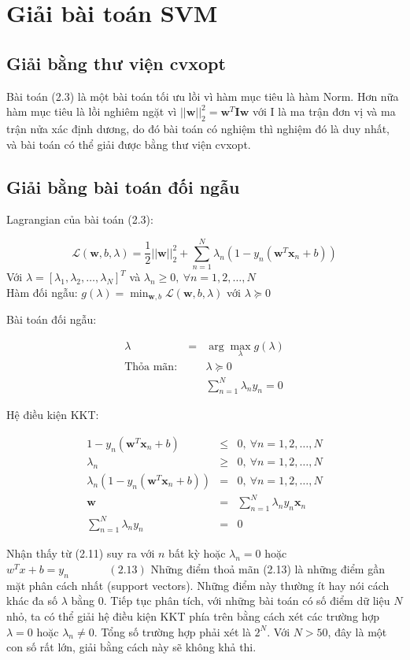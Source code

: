 \documentclass[a4paper, 12pt, oneside]{report}
\begin{document}
\section{Giải bài toán SVM }
\subsection{Giải bằng thư viện cvxopt} 
Bài toán (2.3) là một bài toán tối ưu lồi vì hàm mục tiêu là hàm Norm. Hơn nữa hàm mục tiêu là lồi nghiêm ngặt vì  $||\mathbf{w}||_2^2 =  \mathbf{w}^T\mathbf{I}\mathbf{w}$ với I là ma trận đơn vị và ma trận nửa xác định dương, do đó bài toán có nghiệm thì nghiệm đó là duy nhất, và bài toán có thể giải được bằng thư viện cvxopt.
\subsection{Giải bằng bài toán đối ngẫu}
Lagrangian của bài toán (2.3):
\begin{mybox}
\begin{center}
$$\mathcal{L}(\mathbf{w}, b, \lambda) = \frac{1}{2} ||\mathbf{w}||_2^2 + \sum_{n=1}^N \lambda_n(1 - y_n(\mathbf{w}^T\mathbf{x}_n + b) )$$
Với $\lambda = [\lambda_1, \lambda_2, \dots, \lambda_N]^T$ và $\lambda_n \geq 0, ~\forall n = 1, 2, \dots, N$ \\
Hàm đối ngẫu: $g(\lambda) = \min_{\mathbf{w}, b} \mathcal{L}(\mathbf{w}, b, \lambda)$ với $\lambda \succeq 0$ \\
\end{center}
\end{mybox}
Bài toán đối ngẫu: 
\begin{mybox}
\begin{eqnarray}
     \lambda &=& \arg \max_{\lambda} g(\lambda)   \\
     \text{Thỏa mãn:}~ && \lambda \succeq 0\\
     && \sum_{n=1}^N \lambda_ny_n = 0 
 \end{eqnarray} \end{mybox}
Hệ điều kiện KKT: 
 \begin{mybox}
 \begin{eqnarray}
1 - y_n(\mathbf{w}^T\mathbf{x}_n + b) &\leq& 0, ~ \forall n = 1, 2, \dots, N \\
\lambda_n &\geq& 0, ~\forall n = 1, 2, \dots, N  \\
\lambda_n (1 - y_n(\mathbf{w}^T\mathbf{x}_n + b)) &=& 0, ~\forall n = 1, 2, \dots, N  \\
 \mathbf{w} &=& \sum_{n=1}^N \lambda_n y_n \mathbf{x}_n \\ 
 \sum_{n=1}^N \lambda_ny_n &=& 0
\end{eqnarray} \end{mybox}
Nhận thấy từ (2.11) suy ra với $n$ bất kỳ hoặc $\lambda_n = 0 $ hoặc $w^Tx + b =y_n ~~~~~~~~~~~~~~~~(2.13)$
Những điểm thoả mãn (2.13) là những điểm gần mặt phân cách nhất (support vectors). Những điểm này thường ít hay nói cách khác đa số $\lambda$ bằng 0. Tiếp tục phân tích, với những bài toán có số điểm dữ liệu $N$ nhỏ, ta có thể giải hệ điều kiện KKT phía trên bằng cách xét các trường hợp $\lambda = 0$ hoặc $\lambda_n \neq 0$. Tổng số trường hợp phải xét là $2^N$. Với $N > 50$, đây là một con số rất lớn, giải bằng cách này sẽ không khả thi. 
\end{document}
